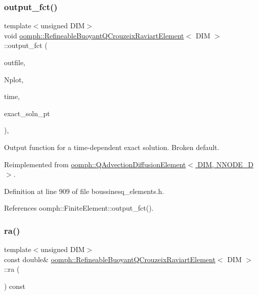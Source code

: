 \subsubsection{\texorpdfstring{output\+\_\+fct()}{output\_fct()}\hspace{0.1cm}{\footnotesize\ttfamily [2/2]}}
{\footnotesize\ttfamily template$<$unsigned D\+IM$>$ \\
void \hyperlink{classoomph_1_1RefineableBuoyantQCrouzeixRaviartElement}{oomph\+::\+Refineable\+Buoyant\+Q\+Crouzeix\+Raviart\+Element}$<$ D\+IM $>$\+::output\+\_\+fct (\begin{DoxyParamCaption}\item[{std\+::ostream \&}]{outfile,  }\item[{const unsigned \&}]{Nplot,  }\item[{const double \&}]{time,  }\item[{\hyperlink{classoomph_1_1FiniteElement_ad4ecf2b61b158a4b4d351a60d23c633e}{Finite\+Element\+::\+Unsteady\+Exact\+Solution\+Fct\+Pt}}]{exact\+\_\+soln\+\_\+pt }\end{DoxyParamCaption})\hspace{0.3cm}{\ttfamily [inline]}, {\ttfamily [virtual]}}



Output function for a time-\/dependent exact solution. Broken default. 



Reimplemented from \hyperlink{classoomph_1_1QAdvectionDiffusionElement_a0e5d05a939eebc797ec8d6b400296bfd}{oomph\+::\+Q\+Advection\+Diffusion\+Element$<$ D\+I\+M, N\+N\+O\+D\+E\+\_\+D $>$}.



Definition at line 909 of file boussinesq\+\_\+elements.\+h.



References oomph\+::\+Finite\+Element\+::output\+\_\+fct().

\mbox{\label{classoomph_1_1RefineableBuoyantQCrouzeixRaviartElement_a56e468f0ee6553a538f6f8d460e6364e}} 
\subsubsection{\texorpdfstring{ra()}{ra()}}
{\footnotesize\ttfamily template$<$unsigned D\+IM$>$ \\
const double\& \hyperlink{classoomph_1_1RefineableBuoyantQCrouzeixRaviartElement}{oomph\+::\+Refineable\+Buoyant\+Q\+Crouzeix\+Raviart\+Element}$<$ D\+IM $>$\+::ra (\begin{DoxyParamCaption}{ }\end{DoxyParamCaption}) const\hspace{0.3cm}{\ttfamily [inline]}}



